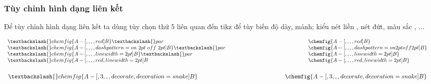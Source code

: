 \documentclass[Main.tex]{subfiles}
\begin{document}
		\subsubsection{Tùy chỉnh hình dạng liên kết}
		Để tùy chỉnh hình dạng  liên kết ta dùng tùy chọn thứ 5 liên quan đến tikz để tùy biến  độ dày, mảnh; kiểu nét liền , nét đứt, màu sắc , $\ldots$
		
		\begin{vd}
			$\begin{array}{lll}
			\textbackslash{}chemfig\{A-[,,,,red]B\}\textbackslash{}par&\phantom{xxxxxxxxxxxxxxxxxxxxxxxx}&\chemfig{A-[,,,,red]B}\\
			\textbackslash{}chemfig\{A-[,,,,dash pattern=on\ 2pt\ off\ 2pt]B\}\textbackslash{}par&\phantom{xxxxxxxxxxxxxxxxxxxxxxxx}&\chemfig{A-[,,,,dash pattern=on 2pt off 2pt]B}\\
			\textbackslash{}chemfig\{A-[,,,,line width=2pt]B\}\textbackslash{}par&\phantom{xxxxxxxxxxxxxxxxxxxxxxxx}&\chemfig{A-[,,,,line width=2pt]B}\\
			\textbackslash{}chemfig\{A-[,,,,red,line width=2pt]B&\phantom{xxxxxxxxxxxxxxxxxxxxxxxx}&\chemfig{A-[,,,,red,line width=2pt]B}
			\end{array}$
		\end{vd}
		
		\begin{vd}
			$\begin{array}{lll}
				\textbackslash{}chemfig\{A-[,3,,,decorate,decoration=snake]B\}&\phantom{xxxxxxxxxxxxxxxxxxxxxx}&\chemfig{A-[,3,,,decorate,decoration=snake]B}
			\end{array}$
		\end{vd}
\end{document}
